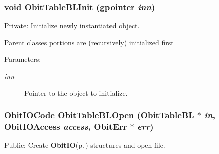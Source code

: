 \subsubsection{\setlength{\rightskip}{0pt plus 5cm}void Obit\-Table\-BLInit (gpointer {\em inn})}\label{ObitTableBL_8c_a8}


Private: Initialize newly instantiated object. 

Parent classes portions are (recursively) initialized first \begin{Desc}
\item[Parameters:]
\begin{description}
\item[{\em inn}]Pointer to the object to initialize. \end{description}
\end{Desc}
\subsubsection{\setlength{\rightskip}{0pt plus 5cm}Obit\-IOCode Obit\-Table\-BLOpen ({\bf Obit\-Table\-BL} $\ast$ {\em in}, Obit\-IOAccess {\em access}, {\bf Obit\-Err} $\ast$ {\em err})}\label{ObitTableBL_8c_a21}


Public: Create {\bf Obit\-IO}{\rm (p.\,\pageref{structObitIO})} structures and open file. 

